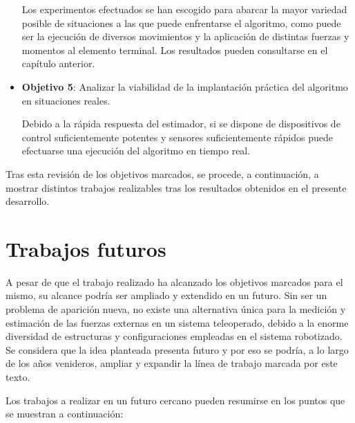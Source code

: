 \begin{itemize}
Los experimentos efectuados se han escogido para abarcar la mayor variedad posible de situaciones a las que puede enfrentarse el algoritmo, como puede ser la ejecución de diversos movimientos y la aplicación de distintas fuerzas y momentos al elemento terminal. Los resultados pueden consultarse en el capítulo anterior. \par 

\item \textbf{Objetivo 5}: Analizar la viabilidad de la implantación práctica del algoritmo en situaciones reales. \par 

Debido a la rápida respuesta del estimador, si se dispone de dispositivos de control suficientemente potentes y sensores suficientemente rápidos puede efectuarse una ejecución del algoritmo en tiempo real. \par 

\end{itemize}

Tras esta revisión de los objetivos marcados, se procede, a continuación, a mostrar distintos trabajos realizables tras los resultados obtenidos en el presente desarrollo. \par 


\section{Trabajos futuros}

A pesar de que el trabajo realizado ha alcanzado los objetivos marcados para el mismo, su alcance podría ser ampliado y extendido en un futuro. Sin ser un problema de aparición nueva, no existe una alternativa única para la medición y estimación de las fuerzas externas en un sistema teleoperado, debido a la enorme diversidad de estructuras y configuraciones empleadas en el sistema robotizado. Se considera que la idea planteada presenta futuro y por eso se podría, a lo largo de los años venideros, ampliar y expandir la línea de trabajo marcada por este texto. \par 

Los trabajos a realizar en un futuro cercano pueden resumirse en los puntos que se muestran a continuación:

